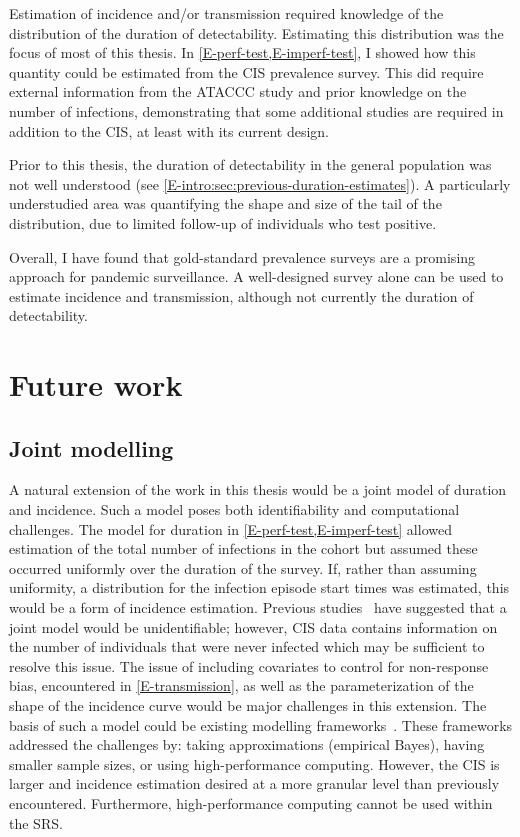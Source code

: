 \documentclass[thesis.tex]{subfiles}
\begin{document}
Estimation of incidence and/or transmission required knowledge of the distribution of the duration of detectability.
Estimating this distribution was the focus of most of this thesis.
In \cref{E-perf-test,E-imperf-test}, I showed how this quantity could be estimated from the CIS prevalence survey.
This did require external information from the ATACCC study and prior knowledge on the number of infections, demonstrating that some additional studies are required in addition to the CIS, at least with its current design.

Prior to this thesis, the duration of detectability in the general population was not well understood (see \cref{E-intro:sec:previous-duration-estimates}).
A particularly understudied area was quantifying the shape and size of the tail of the distribution, due to limited follow-up of individuals who test positive.

Overall, I have found that gold-standard prevalence surveys are a promising approach for pandemic surveillance.
A well-designed survey alone can be used to estimate incidence and transmission, although not currently the duration of detectability.


\section{Future work} \label{conclusion:sec:future-work}

\subsection{Joint modelling}

A natural extension of the work in this thesis would be a joint model of duration and incidence.
Such a model poses both identifiability and computational challenges.
The model for duration in \cref{E-perf-test,E-imperf-test} allowed estimation of the total number of infections in the cohort but assumed these occurred uniformly over the duration of the survey.
If, rather than assuming uniformity, a distribution for the infection episode start times was estimated, this would be a form of incidence estimation.
Previous studies~\autocite[e.g.][]{bacchettiNonparametric} have suggested that a joint model would be unidentifiable; however, CIS data contains information on the number of individuals that were never infected which may be sufficient to resolve this issue.
The issue of including covariates to control for non-response bias, encountered in \cref{E-transmission}, as well as the parameterization of the shape of the incidence curve would be major challenges in this extension.
The basis of such a model could be existing modelling frameworks~\autocite[e.g.][]{taffeJoint,haySerosolver}.
These frameworks addressed the challenges by: taking approximations (\eg empirical Bayes), having smaller sample sizes, or using high-performance computing.
However, the CIS is larger and incidence estimation desired at a more granular level than previously encountered.
Furthermore, high-performance computing cannot be used within the SRS.
\end{document}
